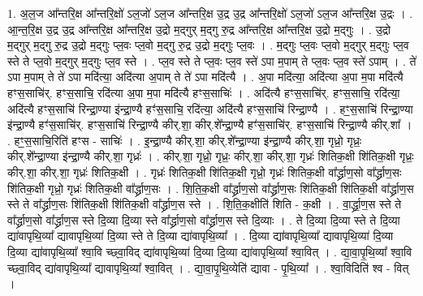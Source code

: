 \documentclass[17pt]{extarticle}
\begin{document}
1. अ॒ल॒ज आ᳚न्तरि॒क्ष आ᳚न्तरि॒क्षो॑ ऽल॒जो॑ ऽल॒ज आ᳚न्तरि॒क्ष उ॒द्र उ॒द्र आ᳚न्तरि॒क्षो॑ ऽल॒जो॑ ऽल॒ज आ᳚न्तरि॒क्ष उ॒द्रः । . आ॒न्त॒रि॒क्ष उ॒द्र उ॒द्र आ᳚न्तरि॒क्ष आ᳚न्तरि॒क्ष उ॒द्रो म॒द्‌गुर् म॒द्‌गु रु॒द्र आ᳚न्तरि॒क्ष आ᳚न्तरि॒क्ष उ॒द्रो म॒द्‌गुः । . उ॒द्रो म॒द्‌गुर् म॒द्‌गु रु॒द्र उ॒द्रो म॒द्‌गुः प्ल॒वः प्ल॒वो म॒द्‌गु रु॒द्र उ॒द्रो म॒द्‌गुः प्ल॒वः । . म॒द्‌गुः प्ल॒वः प्ल॒वो म॒द्‌गुर् म॒द्‌गुः प्ल॒व स्ते ते प्ल॒वो म॒द्‌गुर् म॒द्‌गुः प्ल॒व स्ते । . प्ल॒व स्ते ते प्ल॒वः प्ल॒व स्ते॑ ऽपा म॒पाम् ते प्ल॒वः प्ल॒व स्ते॑ ऽपाम् । . ते॑ ऽपा म॒पाम् ते ते॑ ऽपा मदि॑त्या॒ अदि॑त्या अ॒पाम् ते ते॑ ऽपा मदि॑त्यै । . अ॒पा मदि॑त्या॒ अदि॑त्या अ॒पा म॒पा मदि॑त्यै हꣳस॒साचि॑र्. हꣳस॒साचि॒ रदि॑त्या अ॒पा म॒पा मदि॑त्यै हꣳस॒साचिः॑ । . अदि॑त्यै हꣳस॒साचि॑र्. हꣳस॒साचि॒ रदि॑त्या॒ अदि॑त्यै हꣳस॒साचि॑ रिन्द्रा॒ण्या इ॑न्द्रा॒ण्यै हꣳ॑स॒साचि॒ रदि॑त्या॒ अदि॑त्यै हꣳस॒साचि॑ रिन्द्रा॒ण्यै । . हꣳ॒॒स॒साचि॑ रिन्द्रा॒ण्या इ॑न्द्रा॒ण्यै हꣳ॑स॒साचि॑र्. हꣳस॒साचि॑ रिन्द्रा॒ण्यै कीर्.शा॒ कीर्.शे᳚न्द्रा॒ण्यै हꣳ॑स॒साचि॑र्. हꣳस॒साचि॑ रिन्द्रा॒ण्यै कीर्.शा᳚ । . हꣳ॒॒स॒साचि॒रिति॑ हꣳस - साचिः॑ । . इ॒न्द्रा॒ण्यै कीर्.शा॒ कीर्.शे᳚न्द्रा॒ण्या इ॑न्द्रा॒ण्यै कीर्.शा॒ गृध्रो॒ गृध्रः॒ कीर्.शे᳚न्द्रा॒ण्या इ॑न्द्रा॒ण्यै कीर्.शा॒ गृध्रः॑ । . कीर्.शा॒ गृध्रो॒ गृध्रः॒ कीर्.शा॒ कीर्.शा॒ गृध्रः॑ शितिक॒क्षी शि॑तिक॒क्षी गृध्रः॒ कीर्.शा॒ कीर्.शा॒ गृध्रः॑ शितिक॒क्षी । . गृध्रः॑ शितिक॒क्षी शि॑तिक॒क्षी गृध्रो॒ गृध्रः॑ शितिक॒क्षी वा᳚र्द्ध्राण॒सो वा᳚र्द्ध्राण॒सः शि॑तिक॒क्षी गृध्रो॒ गृध्रः॑ शितिक॒क्षी वा᳚र्द्ध्राण॒सः । . शि॒ति॒क॒क्षी वा᳚र्द्ध्राण॒सो वा᳚र्द्ध्राण॒सः शि॑तिक॒क्षी शि॑तिक॒क्षी वा᳚र्द्ध्राण॒स स्ते ते वा᳚र्द्ध्राण॒सः शि॑तिक॒क्षी शि॑तिक॒क्षी वा᳚र्द्ध्राण॒स स्ते । . शि॒ति॒क॒क्षीति॑ शिति - क॒क्षी । . वा॒र्द्ध्रा॒ण॒स स्ते ते वा᳚र्द्ध्राण॒सो वा᳚र्द्ध्राण॒स स्ते दि॒व्या दि॒व्या स्ते वा᳚र्द्ध्राण॒सो वा᳚र्द्ध्राण॒स स्ते दि॒व्याः । . ते दि॒व्या दि॒व्या स्ते ते दि॒व्या द्या॑वापृथि॒व्या᳚ द्यावापृथि॒व्या॑ दि॒व्या स्ते ते दि॒व्या द्या॑वापृथि॒व्या᳚ । . दि॒व्या द्या॑वापृथि॒व्या᳚ द्यावापृथि॒व्या॑ दि॒व्या दि॒व्या द्या॑वापृथि॒व्या᳚ श्वा॒वि च्छ्वा॒विद् द्या॑वापृथि॒व्या॑ दि॒व्या दि॒व्या द्या॑वापृथि॒व्या᳚ श्वा॒वित् । . द्या॒वा॒पृ॒थि॒व्या᳚ श्वा॒वि च्छ्वा॒विद् द्या॑वापृथि॒व्या᳚ द्यावापृथि॒व्या᳚ श्वा॒वित् । . द्या॒वा॒पृ॒थि॒व्येति॑ द्यावा - पृ॒थि॒व्या᳚ । . श्वा॒विदिति॑ श्व - वित् । \newline
\pagebreak
{}
\end{document}
